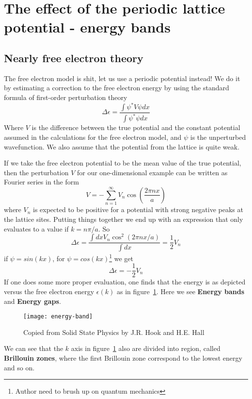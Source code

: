 \documentclass[11pt]{article}
\begin{document}
\section{The effect of the periodic lattice potential - energy bands}
\subsection{Nearly free electron theory}

The free electron model is shit, let us use a periodic potential instead! We do it by estimating a correction to the free electron energy by using the standard formula of first-order perturbation theory
\begin{equation}
\Delta \epsilon = \frac{\int \psi^* V \psi dx}{\int \psi^* \psi dx}
\end{equation}
Where $V$ is the difference between the true potential and the constant potential assumed in the calculations for the free electron model, and $\psi$ is the unperturbed wavefunction. We also assume that the potential from the lattice is quite weak.

If we take the free electron potential to be the mean value of the true potential, then the perturbation $V$ for our one-dimensional example can be written as Fourier series in the form 
\begin{equation}
	V = - \sum^\infty_{n=1} V_n \cos{(\frac{2\pi n x}{a})}
\end{equation}
	where $V_n$ is expected to be positive for a potential with strong negative peaks at the lattice sites. Putting things together we end up with an expression that only evaluates to a value if $k=n\pi/a$. So
\begin{equation}
	\Delta \epsilon = \frac{\int dx V_n \cos^2(2\pi n x/a)}{\int dx} = \frac{1}{2} V_n
\end{equation}
if $\psi = sin(kx)$, for $\psi = cos(kx)$\footnote{Author need to brush up on quantum mechanics} we get
\begin{equation}
	\Delta \epsilon = - \frac{1}{2} V_n
\end{equation}
If one does some more proper evaluation, one finds that the energy is as depicted versus the free electron energy $\epsilon(k)$ as in figure~\ref{fig:energy-band}. Here we see \textbf{Energy bands} and \textbf{Energy gaps}.
\begin{figure}[!ht]
	\centering
	\texttt{[image: energy-band]}
	\caption{Copied from Solid State Physics by J.R. Hook and H.E. Hall}
	\label{fig:energy-band}
\end{figure}
We can see that the $k$ axis in figure~\ref{fig:energy-band} also are divided into region, called \textbf{Brillouin zones}, where the first Brillouin zone correspond to the lowest energy and so on.
\end{document}
